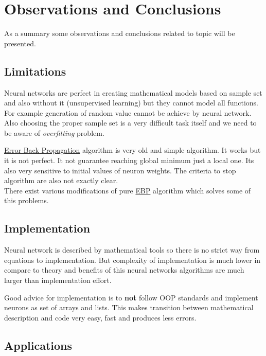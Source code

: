 \section{Observations and Conclusions}
\label{ObservationsConclusions}

As a summary some observations and conclusions related to topic will be presented.

\subsection{Limitations}
\label{Limitations}

Neural networks are perfect in creating mathematical models based on sample set and also without it (unsupervised learning) but they cannot model all functions. For example generation of random value cannot be achieve by neural network. Also choosing the proper sample set is a very difficult task itself and we need to be aware of \textit{overfitting} problem.

\hyperref[sec:Training]{Error Back Propagation} algorithm is very old and simple algorithm. It works but it is not perfect. It not guarantee reaching global minimum just a local one. Its also very sensitive to initial values of neuron weights. The criteria to stop algorithm are also not exactly clear. \\
There exist various modifications of pure \hyperref[sec:Training]{EBP} algorithm which solves some of this problems.

\subsection{Implementation}
\label{Implementation}

Neural network is described by mathematical tools so there is no strict way from equations to implementation.
But complexity of implementation is much lower in compare to theory and benefits of this neural networks algorithms are much larger than implementation effort.

Good advice for implementation is to \textbf{not} follow OOP standards and implement neurons as set of arrays and lists. This makes transition between mathematical description and code very easy, fast and produces less errors.


\subsection{Applications}
\label{Applications}